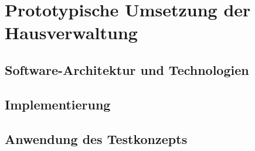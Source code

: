 \section{Prototypische Umsetzung der Hausverwaltung}\label{Prototypische Umsetzung der Hausverwaltung}




\subsection{Software-Architektur und Technologien}




\subsection{Implementierung}


\subsection{Anwendung des Testkonzepts}
